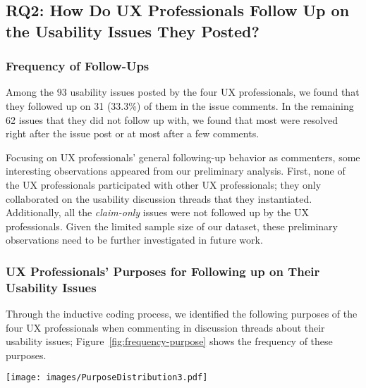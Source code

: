 \subsection{RQ2: How Do UX Professionals Follow Up on the Usability Issues They Posted?}

\subsubsection{Frequency of Follow-Ups}

Among the 93 usability issues posted by the four UX professionals, we found that they followed up on 31 (33.3\%) of them in the issue comments. In the remaining 62 issues that they did not follow up with, we found that most were resolved right after the issue post or at most after a few comments.

Focusing on UX professionals' general following-up behavior as commenters, some interesting observations appeared from our preliminary analysis. First, none of the UX professionals participated with other UX professionals; they only collaborated on the usability discussion threads that they instantiated. Additionally, all the \textit{claim-only} issues were not followed up by the UX professionals. Given the limited sample size of our dataset, these preliminary observations need to be further investigated in future work.

\subsubsection{UX Professionals' Purposes for Following up on Their Usability Issues}
Through the inductive coding process, we identified the following purposes of the four UX professionals when commenting in discussion threads about their usability issues; Figure~\ref{fig:frequency-purpose} shows the frequency of these purposes.

\begin{figure*}[t]
    \centering
    \texttt{[image: images/PurposeDistribution3.pdf]}
    \caption{Frequency of UX professionals' purposes for following up on their usability issues}
    \label{fig:frequency-purpose}
\end{figure*}

